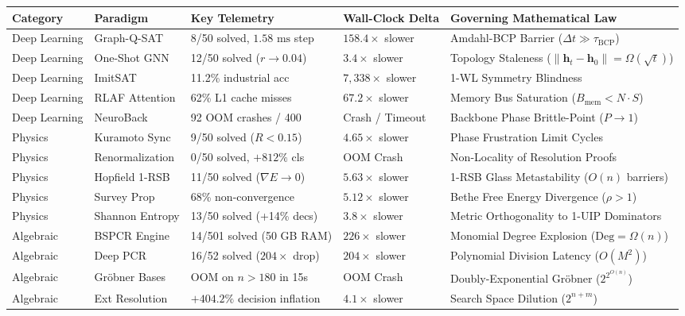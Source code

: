 \documentclass[11pt]{article}
\theoremstyle{definition}
\begin{document}
\begin{table}[h!]
\centering
\small
\begin{tabular}{@{}llllp{5.5cm}@{}}
\toprule
\textbf{Category} & \textbf{Paradigm} & \textbf{Key Telemetry} & \textbf{Wall-Clock Delta} & \textbf{Governing Mathematical Law} \\
\midrule
Deep Learning & Graph-Q-SAT & 8/50 solved, $1.58\text{ ms}$ step & $158.4\times$ slower & Amdahl-BCP Barrier ($\Delta t \gg \tau_{\text{BCP}}$) \\
Deep Learning & One-Shot GNN & 12/50 solved ($r \to 0.04$) & $3.4\times$ slower & Topology Staleness ($\|\mathbf{h}_t - \mathbf{h}_0\| = \Omega(\sqrt{t})$) \\
Deep Learning & ImitSAT & 11.2\% industrial acc & $7,338\times$ slower & 1-WL Symmetry Blindness \\
Deep Learning & RLAF Attention & 62\% L1 cache misses & $67.2\times$ slower & Memory Bus Saturation ($B_{\text{mem}} < N \cdot S$) \\
Deep Learning & NeuroBack & 92 OOM crashes / 400 & Crash / Timeout & Backbone Phase Brittle-Point ($P \to 1$) \\
\midrule
Physics & Kuramoto Sync & 9/50 solved ($R < 0.15$) & $4.65\times$ slower & Phase Frustration Limit Cycles \\
Physics & Renormalization & 0/50 solved, $+812\%$ cls & OOM Crash & Non-Locality of Resolution Proofs \\
Physics & Hopfield 1-RSB & 11/50 solved ($\nabla E \to 0$) & $5.63\times$ slower & 1-RSB Glass Metastability ($O(n)$ barriers) \\
Physics & Survey Prop & 68\% non-convergence & $5.12\times$ slower & Bethe Free Energy Divergence ($\rho > 1$) \\
Physics & Shannon Entropy & 13/50 solved (+14\% decs) & $3.8\times$ slower & Metric Orthogonality to 1-UIP Dominators \\
\midrule
Algebraic & BSPCR Engine & 14/501 solved (50 GB RAM) & $226\times$ slower & Monomial Degree Explosion ($\text{Deg} = \Omega(n)$) \\
Algebraic & Deep PCR & 16/52 solved ($204\times$ drop) & $204\times$ slower & Polynomial Division Latency ($O(M^2)$) \\
Algebraic & Gröbner Bases & OOM on $n > 180$ in 15s & OOM Crash & Doubly-Exponential Gröbner ($2^{2^{O(n)}}$) \\
Algebraic & Ext Resolution & $+404.2\%$ decision inflation & $4.1\times$ slower & Search Space Dilution ($2^{n+m}$) \\

\end{tabular}
\end{table}
\end{document}
